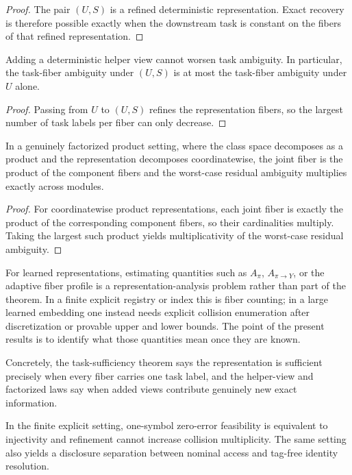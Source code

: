 \begin{proof}
The pair $(U,S)$ is a refined deterministic representation. Exact recovery is therefore possible exactly when the downstream task is constant on the fibers of that refined representation.
\end{proof}

\begin{corollary}\label{cor:helper-view-mono}
Adding a deterministic helper view cannot worsen task ambiguity. In particular, the task-fiber ambiguity under $(U,S)$ is at most the task-fiber ambiguity under $U$ alone.
\end{corollary}

\begin{proof}
Passing from $U$ to $(U,S)$ refines the representation fibers, so the largest number of task labels per fiber can only decrease.
\end{proof}

\begin{corollary}\label{cor:factorized-product-law}
In a genuinely factorized product setting, where the class space decomposes as a product and the representation decomposes coordinatewise, the joint fiber is the product of the component fibers and the worst-case residual ambiguity multiplies exactly across modules.
\end{corollary}

\begin{proof}
For coordinatewise product representations, each joint fiber is exactly the product of the corresponding component fibers, so their cardinalities multiply. Taking the largest such product yields multiplicativity of the worst-case residual ambiguity.
\end{proof}

For learned representations, estimating quantities such as $A_\pi$, $A_{\pi \to Y}$, or the adaptive fiber profile is a representation-analysis problem rather than part of the theorem. In a finite explicit registry or index this is fiber counting; in a large learned embedding one instead needs explicit collision enumeration after discretization or provable upper and lower bounds. The point of the present results is to identify what those quantities mean once they are known.

Concretely, the task-sufficiency theorem says the representation is sufficient precisely when every fiber carries one task label, and the helper-view and factorized laws say when added views contribute genuinely new exact information.

In the finite explicit setting, one-symbol zero-error feasibility is equivalent to injectivity and refinement cannot increase collision multiplicity. The same setting also yields a disclosure separation between nominal access and tag-free identity resolution. 
